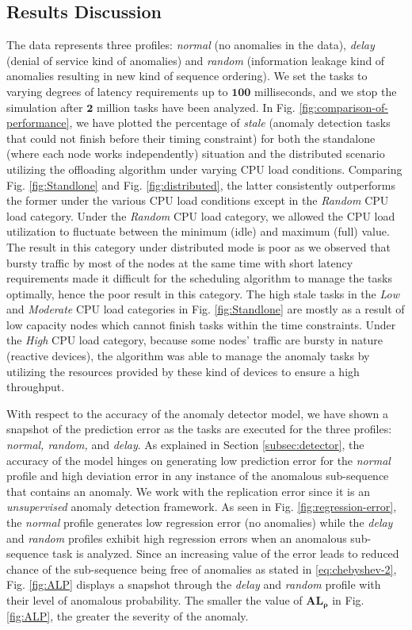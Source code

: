 \subsection{Results Discussion}
\label{subsec:results}
The data represents three profiles: \emph{normal} (no 
anomalies in the data), \emph{delay} (denial of service kind 
of anomalies) and \emph{random} (information leakage kind of 
anomalies resulting in new kind of sequence ordering). We set 
the tasks to varying degrees of latency requirements up to $ 
\bm{100} $ milliseconds, and we stop the simulation after $ 
\bm{2} $ million tasks have been analyzed. In Fig. 
\ref{fig:comparison-of-performance}, we have plotted the 
percentage of \emph{stale} (anomaly detection tasks that 
could not finish before their timing constraint) for both the 
standalone (where each node works independently) situation 
and the distributed scenario utilizing the offloading 
algorithm under varying CPU load conditions. Comparing Fig. 
\ref{fig:Standlone} and Fig. \ref{fig:distributed}, the 
latter consistently outperforms the former under the various 
CPU load conditions 
except in the \emph{Random} CPU load category. Under the 
\emph{Random} CPU load category, we allowed the CPU load 
utilization to fluctuate between the 
minimum (idle) and maximum (full) value. The result in this 
category under distributed mode is poor as we observed that 
bursty 
traffic by most of the nodes at the same time with short 
latency requirements made it difficult for the scheduling 
algorithm to 
manage the tasks optimally, hence the poor result in this 
category. The high stale tasks in the \emph{Low} and 
\emph{Moderate} CPU load categories in Fig. 
\ref{fig:Standlone} are mostly as a result of 
low capacity nodes which cannot finish tasks within the time 
constraints. Under the \emph{High} CPU load category, because 
some nodes' traffic are bursty in nature (reactive devices), 
the algorithm was able to manage the anomaly tasks by 
utilizing the resources provided by these kind of devices to 
ensure a high throughput. \par 
With respect to the accuracy of the anomaly detector model, 
we 
have shown a snapshot of the prediction error as the tasks 
are executed for the three profiles: \emph{normal, random, 
} and \emph{delay}. As explained in Section 
\ref{subsec:detector}, the 
accuracy of the model hinges on generating low prediction 
error for the \emph{normal} profile and high deviation error 
in any instance of the anomalous sub-sequence that contains 
an anomaly. We work with the replication error since it is an 
\emph{unsupervised} anomaly detection framework. As seen in 
Fig. \ref{fig:regression-error}, the \emph{normal} profile 
generates low regression error (no anomalies) while the 
\emph{delay} and \emph{random} profiles exhibit high 
regression errors when an anomalous sub-sequence task is 
analyzed. Since an increasing value of the error leads to 
reduced chance of the sub-sequence being free of anomalies as 
stated in \eqref{eq:chebyshev-2}, Fig. \ref{fig:ALP} 
displays a snapshot through the \emph{delay} and 
\emph{random} profile with their level of anomalous 
probability. The smaller the value of $ \bm{AL_{\rho}} $ in 
Fig. \ref{fig:ALP}, the greater the severity of the anomaly.


